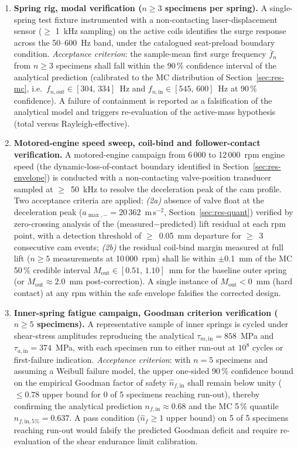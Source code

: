 \begin{enumerate}
\item \textbf{Spring rig, modal verification ($n\geq 3$
specimens per spring).} A single-spring test fixture
instrumented with a non-contacting laser-displacement sensor
($\geq$ 1~kHz sampling) on the active coils identifies the surge
response across the 50--600~Hz band, under the catalogued
seat-preload boundary condition.
\emph{Acceptance criterion}: the sample-mean first surge frequency
$\bar{f}_{n}$ from $n\geq 3$ specimens shall fall within the 90\,\%
confidence interval of the analytical prediction (calibrated to the
MC distribution of Section~\ref{sec:res-mc}, i.e.\
$f_{n,\mathrm{out}}\in [304,\,334]$~Hz and
$f_{n,\mathrm{in}}\in [545,\,600]$~Hz at 90\,\% confidence). A
failure of containment is reported as a falsification of the
analytical model and triggers re-evaluation of the active-mass
hypothesis (total versus Rayleigh-effective).

\item \textbf{Motored-engine speed sweep, coil-bind and
follower-contact verification.} A motored-engine campaign from
6\,000 to 12\,000~rpm engine speed (the dynamic-loss-of-contact
boundary identified in Section~\ref{sec:res-envelope}) is
conducted with a non-contacting valve-position transducer sampled
at $\geq$~50~kHz to resolve the deceleration peak of the cam
profile. Two acceptance criteria are applied:
\emph{(2a)} absence of valve float at the deceleration peak
($a_{\max,-}=20\,362$~m\,s$^{-2}$, Section~\ref{sec:res-quant})
verified by zero-crossing analysis of the
(measured$-$predicted) lift residual at each rpm point, with a
detection threshold of $\geq$~0.05~mm departure for $\geq$~3
consecutive cam events;
\emph{(2b)} the residual coil-bind margin measured at full lift
($n\geq 5$ measurements at 10\,000~rpm) shall lie within
$\pm$0.1~mm of the MC 50\,\% credible interval
$M_{\mathrm{out}}\in [0.51,\,1.10]$~mm for the baseline outer
spring (or $M_{\mathrm{out}}\approx 2.0$~mm post-correction). A
single instance of $M_{\mathrm{out}}<0$~mm (hard contact) at any
rpm within the safe envelope falsifies the corrected design.

\item \textbf{Inner-spring fatigue campaign, Goodman criterion
verification ($n\geq 5$ specimens).} A representative sample of
inner springs is cycled under shear-stress amplitudes reproducing
the analytical
$\tau_{m,\mathrm{in}}=858$~MPa and
$\tau_{a,\mathrm{in}}=374$~MPa, with each specimen run to either
run-out at $10^{8}$ cycles or first-failure indication.
\emph{Acceptance criterion}: with $n=5$ specimens and assuming a
Weibull failure model, the upper one-sided 90\,\% confidence
bound on the empirical Goodman factor of safety
$\hat{n}_{f,\mathrm{in}}$ shall remain below unity ($\leq 0.78$
upper bound for 0 of 5 specimens reaching run-out), thereby
confirming the analytical prediction
$n_{f,\mathrm{in}}\approx 0.68$ and the MC 5\,\% quantile
$n_{f,\mathrm{in,5\%}}=0.637$. A pass condition
($\hat{n}_{f}\geq 1$ upper bound) on 5 of 5 specimens reaching
run-out would falsify the predicted Goodman deficit and require
re-evaluation of the shear endurance limit calibration.
\end{enumerate}

